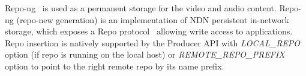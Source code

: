 Repo-ng~\cite{repo-ng} is used as a permanent storage for the video and audio content. Repo-ng (repo-new generation) is an implementation of NDN persistent in-network storage, which exposes a Repo protocol~\cite{Repo-Protocol} allowing write access to applications. Repo insertion is natively supported by the Producer API with \textit{LOCAL\_REPO} option (if repo is running on the local host) or \textit{REMOTE\_REPO\_PREFIX} option to point to the right remote repo by its name prefix. 
